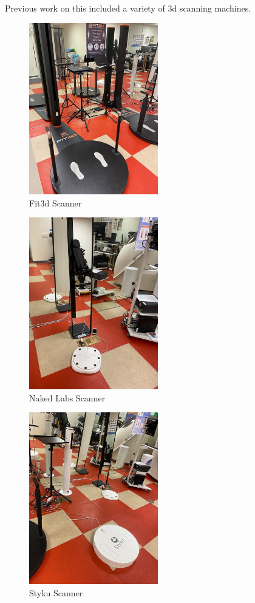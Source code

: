 Previous work on this included a variety of 3d scanning machines. 
\begin{figure}[h]
	\caption{Fit3d Scanner}
	\centering
	\includegraphics[width=0.5\textwidth]{images/fit3d.jpg}
\end{figure}
\begin{figure}[h]
	\caption{Naked Labs Scanner}
	\centering
	\includegraphics[width=0.5\textwidth]{images/naked_labs.jpg}
\end{figure}
\begin{figure}[h]
	\caption{Styku Scanner}
	\centering
	\includegraphics[width=0.5\textwidth]{images/styku.jpg}
\end{figure}
